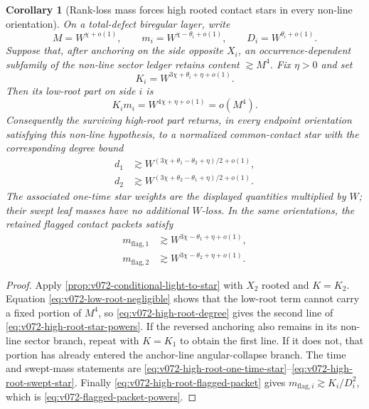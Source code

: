 \documentclass[10pt]{article}
\newtheorem{corollary}[theorem]{Corollary}
\begin{document}
\begin{corollary}[Rank-loss mass forces high rooted contact stars in every non-line orientation]
\label{cor:v072-rank-loss-high-root-stars}
On a total-defect biregular layer, write
\[
M=W^{\chi+o(1)},\qquad
m_i=W^{\chi-\theta_i+o(1)},\qquad
D_i=W^{\theta_i+o(1)}.
\]
Suppose that, after anchoring on the side opposite \(X_i\), an occurrence-dependent subfamily of
the non-line sector ledger retains content \(\gtrsim M^4\).  Fix \(\eta>0\) and set
\[
K_i=W^{3\chi+\theta_i+\eta+o(1)}.
\]
Then its low-root part on side \(i\) is
\begin{equation}
\label{eq:v072-low-root-negligible}
\boxed{
K_im_i
=W^{4\chi+\eta+o(1)}
=o(M^4).
}
\end{equation}
Consequently the surviving high-root part returns, in every endpoint orientation satisfying this
non-line hypothesis, to a normalized common-contact star with the corresponding degree bound
\begin{equation}
\label{eq:v072-high-root-star-powers}
\boxed{
\begin{aligned}
d_1&\gtrsim
W^{(3\chi+\theta_1-\theta_2+\eta)/2+o(1)},\\
d_2&\gtrsim
W^{(3\chi+\theta_2-\theta_1+\eta)/2+o(1)}.
\end{aligned}
}
\end{equation}
The associated one-time star weights are the displayed quantities multiplied by \(W\); their
swept leaf masses have no additional \(W\)-loss.  In the same orientations, the retained flagged
contact packets satisfy
\begin{equation}
\label{eq:v072-flagged-packet-powers}
\boxed{
\begin{aligned}
m_{\mathrm{flag},1}&\gtrsim
W^{3\chi-\theta_1+\eta+o(1)},\\
m_{\mathrm{flag},2}&\gtrsim
W^{3\chi-\theta_2+\eta+o(1)}.
\end{aligned}
}
\end{equation}
\end{corollary}

\begin{proof}
Apply \cref{prop:v072-conditional-light-to-star} with \(X_2\) rooted and \(K=K_2\).
Equation \eqref{eq:v072-low-root-negligible} shows that the low-root term cannot carry a fixed
portion of \(M^4\), so \eqref{eq:v072-high-root-degree} gives the second line of
\eqref{eq:v072-high-root-star-powers}.  If the reversed anchoring also remains in its non-line
sector branch, repeat with \(K=K_1\) to obtain the first line.  If it does not, that portion has
already entered the anchor-line angular-collapse branch.  The time and swept-mass statements are
\eqref{eq:v072-high-root-one-time-star}--\eqref{eq:v072-high-root-swept-star}.
Finally \eqref{eq:v072-high-root-flagged-packet} gives
\(m_{\mathrm{flag},i}\gtrsim K_i/D_i^2\), which is
\eqref{eq:v072-flagged-packet-powers}.
\end{proof}
\end{document}

